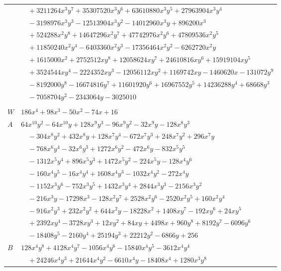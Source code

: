 \documentclass[11pt]{article}
\begin{document}
\begin{longtable}{@{}ll@{}}
 & $\quad +3211264x^{3}y^{7}+35307520x^{3}y^{6}+63610880x^{3}y^{5}+27963904x^{3}y^{4}$\\
 & $\quad -3198976x^{3}y^{3}-12513904x^{3}y^{2}-14012960x^{3}y+896200x^{3}$\\
 & $\quad +524288x^{2}y^{8}+14647296x^{2}y^{7}+47742976x^{2}y^{6}+47809536x^{2}y^{5}$\\
 & $\quad +11850240x^{2}y^{4}-6403360x^{2}y^{3}-17356464x^{2}y^{2}-6262720x^{2}y$\\
 & $\quad +1615000x^{2}+2752512xy^{8}+12058624xy^{7}+24610816xy^{6}+15919104xy^{5}$\\
 & $\quad +3524544xy^{4}-2224352xy^{3}-12056112xy^{2}+1169742xy-1460620x-131072y^{9}$\\
 & $\quad -8192000y^{8}-16674816y^{7}+11601920y^{6}+16967552y^{5}+14236288y^{4}+68668y^{3}$\\
 & $\quad -7058704y^{2}-2343064y-3025010$\\
\addlinespace[3pt]
\multicolumn{2}{@{}l}{$i=8$, $m=1$, neighbours $0,4,11,16,24,28,29,30,31,34$}\\
$W$ & $186x^{4}+98x^{3}-50x^{2}-74x+16$\\
$A$ & $64x^{10}y^{2}-64x^{10}y+128x^{9}y^{3}-96x^{9}y^{2}-32x^{9}y-128x^{8}y^{3}$\\
 & $\quad -304x^{8}y^{2}+432x^{8}y+128x^{7}y^{4}-672x^{7}y^{3}+248x^{7}y^{2}+296x^{7}y$\\
 & $\quad -768x^{6}y^{4}-32x^{6}y^{3}+1272x^{6}y^{2}-472x^{6}y-832x^{5}y^{5}$\\
 & $\quad -1312x^{5}y^{4}+896x^{5}y^{3}+1472x^{5}y^{2}-224x^{5}y-128x^{4}y^{6}$\\
 & $\quad -160x^{4}y^{5}-16x^{4}y^{4}+1608x^{4}y^{3}-1032x^{4}y^{2}-272x^{4}y$\\
 & $\quad -1152x^{3}y^{6}-752x^{3}y^{5}+1432x^{3}y^{4}+2844x^{3}y^{3}-2156x^{3}y^{2}$\\
 & $\quad -216x^{3}y-17298x^{3}-128x^{2}y^{7}+2528x^{2}y^{6}-2520x^{2}y^{5}+160x^{2}y^{4}$\\
 & $\quad -916x^{2}y^{3}+232x^{2}y^{2}+644x^{2}y-18228x^{2}+1408xy^{7}-192xy^{6}+24xy^{5}$\\
 & $\quad +2392xy^{4}-3728xy^{3}+12xy^{2}+84xy+4498x+960y^{8}+8192y^{7}-6096y^{6}$\\
 & $\quad -18408y^{5}-2160y^{4}+25194y^{3}+22212y^{2}-6866y+256$\\
$B$ & $128x^{4}y^{8}+4128x^{4}y^{7}-1056x^{4}y^{6}-15840x^{4}y^{5}-3612x^{4}y^{4}$\\
 & $\quad +24246x^{4}y^{3}+21644x^{4}y^{2}-6610x^{4}y-18408x^{4}+1280x^{3}y^{8}$\\

\end{longtable}
\end{document}
